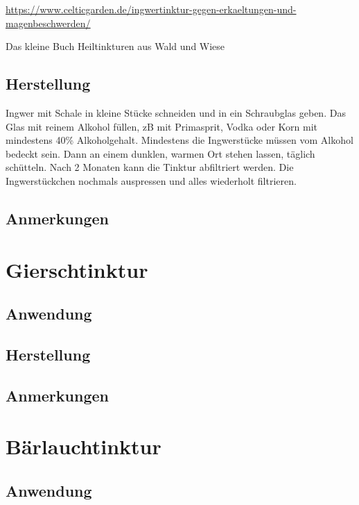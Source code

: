 \url{https://www.celticgarden.de/ingwertinktur-gegen-erkaeltungen-und-magenbeschwerden/}

Das kleine Buch Heiltinkturen aus Wald und Wiese


\subsection{Herstellung}

Ingwer mit Schale in kleine Stücke schneiden und in ein Schraubglas geben. Das Glas mit reinem Alkohol füllen, zB mit Primasprit, Vodka oder Korn mit mindestens 40\% Alkoholgehalt. Mindestens die Ingwerstücke müssen vom Alkohol bedeckt sein. Dann an einem dunklen, warmen Ort stehen lassen, täglich schütteln. Nach 2 Monaten kann die Tinktur abfiltriert werden. Die Ingwerstückchen nochmals auspressen und alles wiederholt filtrieren.

\subsection{Anmerkungen}




\section{Gierschtinktur}

\subsection{Anwendung}

\subsection{Herstellung}

\subsection{Anmerkungen}





\section{Bärlauchtinktur}

\subsection{Anwendung}

